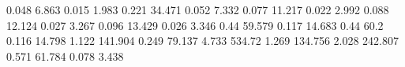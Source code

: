 0.048      6.863      %
0.015      1.983      %
0.221      34.471     %
0.052      7.332      %
0.077      11.217     %
0.022      2.992      %
0.088      12.124     %
0.027      3.267      %
0.096      13.429     %
0.026      3.346      %
0.44       59.579     %
0.117      14.683     %
0.44       60.2       %
0.116      14.798     %
1.122      141.904    %
0.249      79.137     %
4.733      534.72     %
1.269      134.756    %
2.028      242.807    %
0.571      61.784     %
0.078      3.438      %
